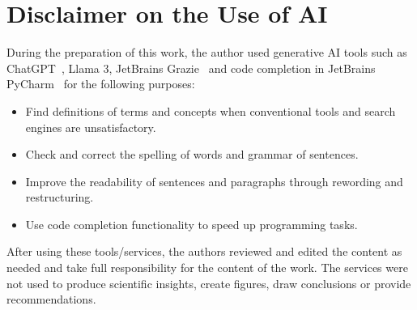 \section*{Disclaimer on the Use of AI}
\label{sec:disclaimer-use-ai}

During the preparation of this work, the author used generative AI tools such as ChatGPT\ \citep{openai2023chatgpt},
Llama 3, JetBrains Grazie\ \citep{jetbrains_grazie} and code completion in JetBrains PyCharm\ \citep{jetbrains_pycharm}
for the following purposes:

\begin{itemize}
    \item Find definitions of terms and concepts when conventional tools and search engines are unsatisfactory.
    \item Check and correct the spelling of words and grammar of sentences.
    \item Improve the readability of sentences and paragraphs through rewording and restructuring.
    \item Use code completion functionality to speed up programming tasks.
\end{itemize}

After using these tools/services, the authors reviewed and edited the content as needed and take full responsibility for
the content of the work.
The services were not used to produce scientific insights, create figures, draw conclusions or provide recommendations.